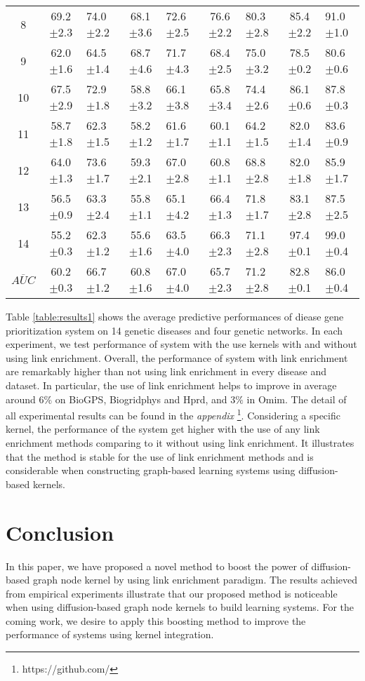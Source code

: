 \documentclass[runningheads,a4paper]{llncs}
\begin{document}
{\begin{table*}[!htbp]
\begin{tabular}{|c|c|g|c|g|c|g|c|g|}
8 & 69.2$\pm$2.3 & 74.0$\pm$2.2 & 68.1$\pm$3.6 & 72.6$\pm$2.5 & 76.6$\pm$2.2 & 80.3$\pm$2.8 & 85.4$\pm$2.2 & 91.0$\pm$1.0 \\
9 & 62.0$\pm$1.6 & 64.5$\pm$1.4 & 68.7$\pm$4.6 & 71.7$\pm$4.3 & 68.4$\pm$2.5 & 75.0$\pm$3.2 & 78.5$\pm$0.2 & 80.6$\pm$0.6 \\
10 & 67.5$\pm$2.9 & 72.9$\pm$1.8 & 58.8$\pm$3.2 & 66.1$\pm$3.8 & 65.8$\pm$3.4 & 74.4$\pm$2.6 & 86.1$\pm$0.6 & 87.8$\pm$0.3 \\
11 & 58.7$\pm$1.8 & 62.3$\pm$1.5 & 58.2$\pm$1.2 & 61.6$\pm$1.7 & 60.1$\pm$1.1 & 64.2$\pm$1.5 & 82.0$\pm$1.4 & 83.6$\pm$0.9 \\
12 & 64.0$\pm$1.3 & 73.6$\pm$1.7 & 59.3$\pm$2.1 & 67.0$\pm$2.8 & 60.8$\pm$1.1 & 68.8$\pm$2.8 & 82.0$\pm$1.8 & 85.9$\pm$1.7 \\
13 & 56.5$\pm$0.9 & 63.3$\pm$2.4 & 55.8$\pm$1.1 & 65.1$\pm$4.2 & 66.4$\pm$1.3 & 71.8$\pm$1.7 & 83.1$\pm$2.8 & 87.5$\pm$2.5 \\
14 & 55.2$\pm$0.3 & 62.3$\pm$1.2 & 55.6$\pm$1.6 & 63.5$\pm$4.0 & 66.3$\pm$2.3 & 71.1$\pm$2.8 & 97.4$\pm$0.1 & 99.0$\pm$0.4 \\
\hline
$\overline{AUC}$ & 60.2$\pm$0.3 & 66.7$\pm$1.2 & 60.8$\pm$1.6 & 67.0$\pm$4.0 & 65.7$\pm$2.3 & 71.2$\pm$2.8 & 82.8$\pm$0.1 & 86.0$\pm$0.4 \\
\hline
\end{tabular}
\end{table*}
\newcommand{\squeezeup}{\vspace{-4mm}}
\squeezeup
Table \ref{table:results1} shows the average predictive performances of diease gene prioritization system on 14 genetic diseases and four genetic networks. In each experiment, we test performance of system with the use kernels with and without using link enrichment. Overall, the performance of system with link enrichment are remarkably higher than not using link enrichment in every disease and dataset. In particular, the use of link enrichment helps to improve in average around 6$\%$ on BioGPS, Biogridphys and Hprd, and 3$\%$ in Omim. The detail of all experimental results can be found in the \textit{appendix} \footnote{https://github.com/}. Considering a specific kernel, the performance of the system get higher with the use of any link enrichment methods comparing to it without using link enrichment. 
It illustrates that the method is stable for the use of link enrichment methods and is considerable when constructing graph-based learning systems using diffusion-based kernels.

\section{Conclusion}
\label{conclusion}
In this paper, we have proposed a novel method to boost the power of diffusion-based graph node kernel by using link enrichment paradigm. The results achieved from empirical experiments illustrate that our proposed method is noticeable when using diffusion-based graph node kernels to build learning systems. For the coming work, we desire to apply this boosting method to improve the performance of systems using kernel integration.


}
\end{document}
